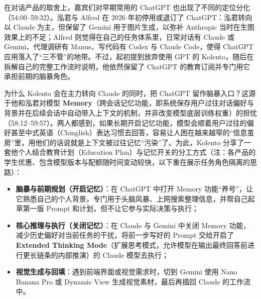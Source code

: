 \documentclass[UTF8,a4paper,11pt,fontset=fandol]{ctexart}
\begin{document}
在对话产品的取舍上，嘉宾们对早期常用的 ChatGPT 也出现了不同的定位分化（54:00–59:32）。泓君与 Alfred 在 2026 年初停用或退订了 ChatGPT：泓君转向以 Claude 为主，但保留了 Gemini 用于图片生成，以弥补 Anthropic 当时在生图效果上的不足；Alfred 则觉得在自己的任务体系里，日常对话有 Claude 或 Gemini、代理调研有 Manus、写代码有 Codex 与 Claude Code，使得 ChatGPT 应用落入了“三不管”的地带。不过，起初提到放弃使用 GPT 的 Kolento，随后在拆解自己的完整工作流时说明，他依然保留了 ChatGPT 的教育订阅并专门用它承担前期的脑暴角色。

为什么 Kolento 会在主力转向 Claude 的同时，把 ChatGPT 留作脑暴入口？这源于他和泓君对模型 \textbf{Memory}（跨会话记忆功能，即系统保存用户过往对话偏好与背景并在后续会话中自动带入上下文的机制，并非改变模型底层训练权重）的担忧（58:12–59:57）。两人都感到，如果长期开启记忆功能，模型会顺着用户过往的偏好甚至中式英语（Chinglish）表达习惯去回答，容易让人困在越来越窄的“信息茧房”里，用他们的话说就是上下文被过往记忆“污染”了。为此，Kolento 分享了一套他个人结合教育计划（Education Plan）与记忆开关的分工方式（注：各产品的学生优惠、包含模型版本与配额随时间变动较快，以下重在展示任务角色隔离的思路）：
\begin{itemize}
\item \textbf{脑暴与前期规划（开启记忆）}：在 ChatGPT 中打开 Memory 功能“养号”，让它熟悉自己的个人背景，专门用于头脑风暴、上网搜索整理信息，并帮自己起草第一版 Prompt 和计划，但不让它参与实际决策与执行；
\item \textbf{核心推理与执行（关闭记忆）}：在 Claude 与 Gemini 中关闭 Memory 功能，减少历史偏好对当前任务的干扰，将前一步写好的 Prompt 交给开启了 \textbf{Extended Thinking Mode}（扩展思考模式，允许模型在输出最终回答前进行更长链条的内部推演）的 Claude 模型去执行；
\item \textbf{视觉生成与回填}：遇到前端界面或视觉需求时，切到 Gemini 使用 Nano Banana Pro 或 Dynamic View 生成视觉素材，最后再插回 Claude 的工作流中。
\end{itemize}
\end{document}
